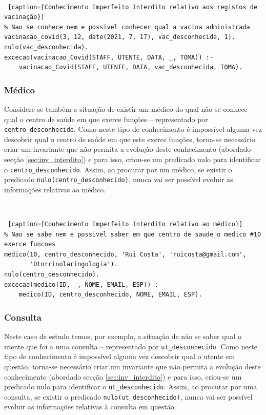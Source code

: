 \documentclass[a4paper, 11pt]{article}
\begin{document}
\

\begin{lstlisting} [caption={Conhecimento Imperfeito Interdito relativo aos registos de 
vacinação}]
% Nao se conhece nem e possivel conhecer qual a vacina administrada
vacinacao_covid(3, 12, date(2021, 7, 17), vac_desconhecida, 1).
nulo(vac_desconhecida).
excecao(vacinacao_Covid(STAFF, UTENTE, DATA, _, TOMA)) :-
    vacinacao_Covid(STAFF, UTENTE, DATA, vac_desconhecida, TOMA).
\end{lstlisting}

\subsubsection*{Médico}

Considere-se também a situação de existir um médico do qual não se conhece qual o centro de 
saúde em que exerce funções -- representado por \texttt{centro\_desconhecido}. Como neste tipo 
de conhecimento
é impossível alguma vez descobrir qual o centro de saúde em que este exerce funções, torna-se 
necessário criar um invariante que não permita a evolução deste conhecimento (abordado secção 
\ref{sec:inv_interdito}) e para isso, criou-se um predicado nulo para identificar o 
\texttt{centro\_desconhecido}.
Assim, ao procurar por um médico, se existir o predicado \texttt{nulo(centro\_desconhecido)}, 
nunca vai ser
possível evoluir as informações relativas ao médico.

\

\begin{lstlisting} [caption={Conhecimento Imperfeito Interdito relativo ao médico}]
% Nao se sabe nem e possivel saber em que centro de saude o medico #10 exerce funcoes
medico(10, centro_desconhecido, 'Rui Costa', 'ruicosta@gmail.com',
       'Otorrinolaringologia').
nulo(centro_desconhecido).
excecao(medico(ID, _, NOME, EMAIL, ESP)) :-
    medico(ID, centro_desconhecido, NOME, EMAIL, ESP).
\end{lstlisting}

\subsubsection*{Consulta}

Neste caso de estudo temos, por exemplo, a situação de não se saber qual o utente que foi a uma 
consulta -- representado por \texttt{ut\_desconhecido}. Como neste tipo de conhecimento
é impossível alguma vez descobrir qual o utente em questão, torna-se necessário criar um 
invariante que não permita a evolução deste conhecimento (abordado secção 
\ref{sec:inv_interdito}) e para isso, criou-se um predicado nulo para identificar o 
\texttt{ut\_desconhecido}.
Assim, ao procurar por uma consulta, se existir o predicado \texttt{nulo(ut\_desconhecido)}, nunca 
vai ser
possível evoluir as informações relativas à consulta em questão.
\end{document}
